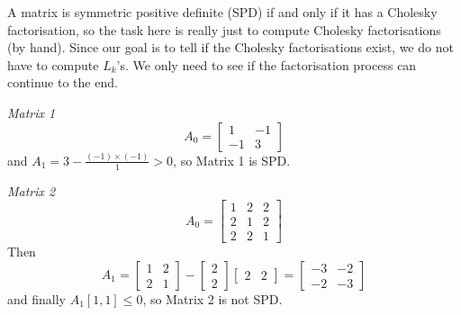 \documentclass[12pt,a4paper]{article}
\begin{document}
A matrix is symmetric positive definite (SPD) if and only if it has a Cholesky factorisation, so the task here is really just to compute Cholesky factorisations (by hand). Since our goal is to tell if the Cholesky factorisations exist, we do not have to compute $L_k$'s. We only need to see if the factorisation process can continue to the end.

\emph{Matrix 1}
\[
A_0=\begin{bmatrix} 1 & -1  \\
-1 & 3
\end{bmatrix}
\]
and     $A_1=3-\frac{(-1)\ensuremath{\times}(-1)}{1}>0$, so Matrix 1 is SPD.

\emph{Matrix 2}
\[
A_0=\begin{bmatrix}
1 & 2 & 2 \\
2 & 1 & 2 \\
2 & 2 & 1
\end{bmatrix}
\]
Then
\[
A_1=\begin{bmatrix}
1&2\\
2&1
\end{bmatrix}-\begin{bmatrix} 2 \\ 2 \end{bmatrix}\begin{bmatrix} 2 & 2 \end{bmatrix}=
\begin{bmatrix}
-3&-2\\
-2&-3
\end{bmatrix}
\]
and finally $A_1[1,1] \ensuremath{\leq} 0$, so Matrix 2 is not SPD.
\end{document}
